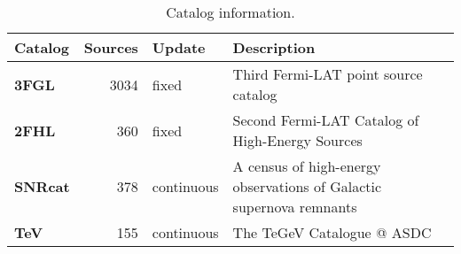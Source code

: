 \begin{table}[h]

\caption{Catalog information.}
\label{tab:a}
\begin{tabular}{ || l|rll ||}
\hline


\textbf{Catalog} & \textbf{Sources} & \textbf{Update} & \textbf{Description} \\ \hline
\textbf{3FGL} & 3034 & fixed & Third Fermi-LAT point source catalog\\
\textbf{2FHL} & 360 & fixed & Second Fermi-LAT Catalog of High-Energy Sources\\
\textbf{SNRcat} & 378 & continuous & A census of high-energy observations of Galactic supernova remnants\\
\textbf{TeV} & 155 & continuous & The TeGeV Catalogue @ ASDC\\
\hline
\end{tabular}
\end{table}
